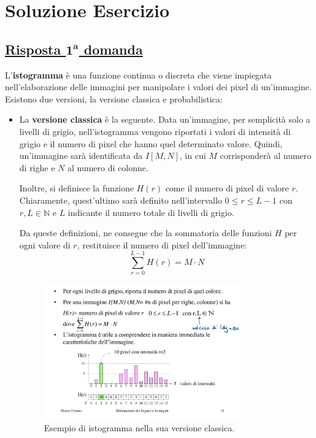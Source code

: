\documentclass[a4paper]{article}
\begin{document}
	\section{Soluzione Esercizio}
	
	\subsection*{\textcolor{Green4}{\underline{Risposta $\boldsymbol{1^{a}}$ domanda}}}
	
	\noindent
	L'\textbf{istogramma} è una funzione continua o discreta che viene impiegata nell'elaborazione delle immagini per manipolare i valori dei pixel di un'immagine.\newline
	Esistono due versioni, la versione classica e probabilistica:
	\begin{itemize}
		\item La \textbf{versione classica} è la seguente.\newline
		Data un'immagine, per semplicità solo a livelli di grigio, nell'istogramma vengono riportati i valori di intensità di grigio e il numero di pixel che hanno quel determinato valore. Quindi, un'immagine sarà identificata da $I\left[M,N\right]$, in cui $M$ corrisponderà al numero di righe e $N$ al numero di colonne. 
		
		Inoltre, si definisce la funzione $H\left(r\right)$ come il numero di pixel di valore $r$. Chiaramente, quest'ultimo sarà definito nell'intervallo $0 \le r \le L - 1$ con $r,L \in \mathbb{N}$ e $L$ indicante il numero totale di livelli di grigio.
		
		Da queste definizioni, ne consegue che la sommatoria delle funzioni $H$ per ogni valore di $r$, restituisce il numero di pixel dell'immagine:
		\begin{equation*}
			\sum_{r = 0}^{L - 1} H\left(r\right) = M \cdot N
		\end{equation*}
		\begin{figure}[!htp]
			\centering
			\includegraphics[width=0.8\textwidth]{img/istogramma.pdf}
			\caption*{Esempio di istogramma nella sua versione classica.}
		\end{figure}
	

\end{itemize}
\end{document}

